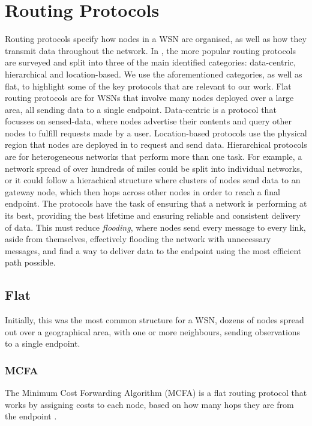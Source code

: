 \section{Routing Protocols} \label{bg:rp} 
	Routing protocols specify how nodes in a WSN are organised, as well as how they transmit data throughout the network. In \cite{Akkaya2005}, the more popular routing protocols are surveyed and split into three of the main identified categories: data-centric, hierarchical and location-based. We use the aforementioned categories, as well as flat, to highlight some of the key protocols that are relevant to our work. Flat routing protocols are for WSNs that involve many nodes deployed over a large area, all sending data to a single endpoint. Data-centric is a protocol that focusses on sensed-data, where nodes advertise their contents and query other nodes to fulfill requests made by a user. Location-based protocols use the physical region that nodes are deployed in to request and send data. Hierarchical protocols are for heterogeneous networks that perform more than one task. For example, a network spread of over hundreds of miles could be split into individual networks, or it could follow a hierachical structure where clusters of nodes send data to an gateway node, which then hops across other nodes in order to reach a final endpoint.
	The protocols have the task of ensuring that a network is performing at its best, providing the best lifetime and ensuring reliable and consistent delivery of data. This must reduce \textit{flooding}, where nodes send every message to every link, aside from themselves, effectively flooding the network with unnecessary messages, and find a way to deliver data to the endpoint using the most efficient path possible.

\subsection{Flat}
	Initially, this was the most common structure for a WSN, dozens of nodes spread out over a geographical area, with one or more neighbours, sending observations to a single endpoint.

\subsubsection{MCFA} \label{bg:rp:mcfa}
	The Minimum Cost Forwarding Algorithm (MCFA) is a flat routing protocol that works by assigning costs to each node, based on how many hops they are from the endpoint \cite{Ye2001}. 

